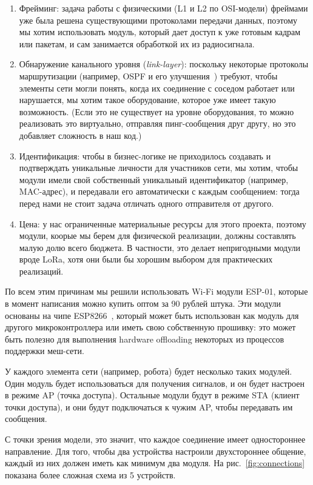 \documentclass[%
]{article}
\begin{document}
\begin{enumerate}
\item Фрейминг: задача работы с физическими (L1 и L2 по OSI-модели) фреймами уже была решена существующими протоколами передачи данных,
поэтому мы хотим использовать модуль, который дает доступ к уже готовым кадрам или пакетам, и сам занимается обработкой их из радиосигнала.
\item Обнаружение канального уровня (\emph{link-layer}): поскольку некоторые протоколы маршрутизации (например, OSPF и его улучшения~\cite{rfc5614}) требуют,
чтобы элементы сети могли понять, когда их соединение с соседом работает или нарушается,
мы хотим такое оборудование, которое уже имеет такую возможность.
(Если это не существует на уровне оборудования, то можно реализовать это виртуально,
отправляя пинг-сообщения друг другу,
но это добавляет сложность в наш код.)

\item Идентификация: чтобы в бизнес-логике не приходилось создавать и подтверждать уникальные личности для участников сети,
мы хотим, чтобы модули имели свой собственный уникальный идентификатор (например, MAC-адрес),
и передавали его автоматически с каждым сообщением:
тогда перед нами не стоит задача отличать одного отправителя от другого. 

\item Цена: у нас ограниченные материальные ресурсы для этого проекта, поэтому модули, коорые мы берем для физической реализации,
должны составлять малую долю всего бюджета.
В частности, это делает непригодными модули вроде LoRa,
хотя они были бы хорошим выбором для практических реализаций.
\end{enumerate}

По всем этим причинам мы решили использовать Wi-Fi модули ESP-01,
которые в момент написания можно купить оптом за 90 рублей штука.
Эти модули основаны на чипе ESP8266~\cite{esp8266},
который может быть использован как модуль для другого микроконтроллера
или иметь свою собственную прошивку:
это может быть полезно для выполнения hardware offloading
некоторых из процессов поддержки меш-сети.

У каждого элемента сети (например, робота)
будет несколько таких модулей.
Один модуль будет использоваться для получения сигналов,
и он будет настроен в режиме AP (точка доступа).
Остальные модули будут в режиме STA (клиент точки доступа),
и они будут подключаться к чужим AP,
чтобы передавать им сообщения.

С точки зрения модели, это значит,
что каждое соединение имеет одностороннее направление.
Для того, чтобы два устройства настроили двухстороннее общение,
каждый из них должен иметь как минимум два модуля.
На рис.~\ref{fig:connections} показана более сложная схема из 5 устройств.
\end{document}
